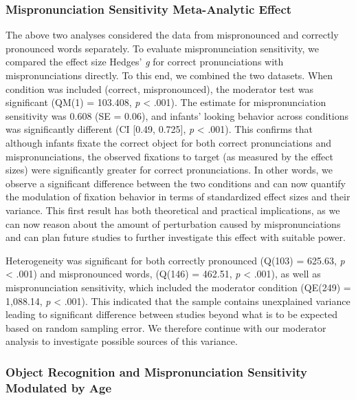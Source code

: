 \documentclass[man]{apa6}
\theoremstyle{definition}
\theoremstyle{definition}
\theoremstyle{definition}
\theoremstyle{remark}
\begin{document}
\subsubsection{Mispronunciation Sensitivity Meta-Analytic
Effect}\label{mispronunciation-sensitivity-meta-analytic-effect}

The above two analyses considered the data from mispronounced and
correctly pronounced words separately. To evaluate mispronunciation
sensitivity, we compared the effect size Hedges' \emph{g} for correct
pronunciations with mispronunciations directly. To this end, we combined
the two datasets. When condition was included (correct, mispronounced),
the moderator test was significant (QM(1) = 103.408, \emph{p}
\textless{} .001). The estimate for mispronunciation sensitivity was
0.608 (SE = 0.06), and infants' looking behavior across conditions was
significantly different (CI {[}0.49, 0.725{]}, \emph{p} \textless{}
.001). This confirms that although infants fixate the correct object for
both correct pronunciations and mispronunciations, the observed
fixations to target (as measured by the effect sizes) were significantly
greater for correct pronunciations. In other words, we observe a
significant difference between the two conditions and can now quantify
the modulation of fixation behavior in terms of standardized effect
sizes and their variance. This first result has both theoretical and
practical implications, as we can now reason about the amount of
perturbation caused by mispronunciations and can plan future studies to
further investigate this effect with suitable power.

Heterogeneity was significant for both correctly pronounced (Q(103) =
625.63, \emph{p} \textless{} .001) and mispronounced words, (Q(146) =
462.51, \emph{p} \textless{} .001), as well as mispronunciation
sensitivity, which included the moderator condition (QE(249) = 1,088.14,
\emph{p} \textless{} .001). This indicated that the sample contains
unexplained variance leading to significant difference between studies
beyond what is to be expected based on random sampling error. We
therefore continue with our moderator analysis to investigate possible
sources of this variance.

\subsubsection{Object Recognition and Mispronunciation Sensitivity
Modulated by
Age}\label{object-recognition-and-mispronunciation-sensitivity-modulated-by-age}
\end{document}

